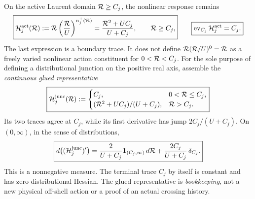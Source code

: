 \documentclass[12pt,a4paper]{article}
\begin{document}
\begin{theorem}
On the active Laurent domain \(\mathcal R\ge C_j\), the nonlinear response remains
\begin{equation}
\label{p3d:eq:active-laurent-response-and-trace}
 \boxed{
 \mathcal H_j^{\rm act}(\mathcal R)
 :=\mathcal R\left(\frac{\mathcal R}{U}\right)^{n_j^+(\mathcal R)}
 =\frac{\mathcal R^2+UC_j}{U+C_j},\qquad \mathcal R\ge C_j,}
 \qquad
 \boxed{\operatorname{ev}_{C_j}\mathcal H_j^{\rm act}=C_j.}
\end{equation}
The last expression is a boundary trace.  It does not define
\(\mathcal R(\mathcal R/U)^0=\mathcal R\) as a freely varied nonlinear action constituent
for \(0<\mathcal R<C_j\).  For the sole purpose of defining a distributional junction on the positive
real axis, assemble the \emph{continuous glued representative}
\begin{equation}
\label{p3d:eq:laurent-trace-glued-representative}
 \boxed{\mathcal H_j^{\rm junc}(\mathcal R):=
 \begin{cases}
 C_j,&0<\mathcal R\le C_j,\\
 (\mathcal R^2+UC_j)/(U+C_j),&\mathcal R>C_j.
 \end{cases}}
\end{equation}
Its two traces agree at \(C_j\), while its first derivative has jump
\(2C_j/(U+C_j)\). On \((0,\infty)\), in the sense of distributions,
\begin{equation}
\label{p3d:eq:endpoint-trace-positive-hessian-measure}
 \boxed{d\bigl((\mathcal H_j^{\rm junc})'\bigr)
 =\frac{2}{U+C_j}\mathbf1_{(C_j,\infty)}\,d\mathcal R
  +\frac{2C_j}{U+C_j}\,\delta_{C_j}.}
\end{equation}
This is a nonnegative measure. The terminal trace \(C_j\) by itself is
constant and has zero distributional Hessian. The glued representative is
\emph{bookkeeping}, not a new physical off-shell action or a proof of an
actual crossing history.
\end{theorem}
\end{document}
